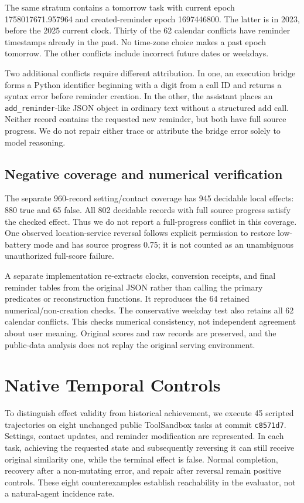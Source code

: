 \documentclass[10pt,letterpaper]{article}
\begin{document}
The same stratum contains a tomorrow task with current epoch 1758017671.957964 and created-reminder epoch 1697446800. The latter is in 2023, before the 2025 current clock. Thirty of the 62 calendar conflicts have reminder timestamps already in the past. No time-zone choice makes a past epoch tomorrow. The other conflicts include incorrect future dates or weekdays.

Two additional conflicts require different attribution. In one, an execution bridge forms a Python identifier beginning with a digit from a call ID and returns a syntax error before reminder creation. In the other, the assistant places an \texttt{add\_reminder}-like JSON object in ordinary text without a structured add call. Neither record contains the requested new reminder, but both have full source progress. We do not repair either trace or attribute the bridge error solely to model reasoning.

\subsection{Negative coverage and numerical verification}
The separate 960-record setting/contact coverage has 945 decidable local effects: 880 true and 65 false. All 802 decidable records with full source progress satisfy the checked effect. Thus we do not report a full-progress conflict in this coverage. One observed location-service reversal follows explicit permission to restore low-battery mode and has source progress 0.75; it is not counted as an unambiguous unauthorized full-score failure.

A separate implementation re-extracts clocks, conversion receipts, and final reminder tables from the original JSON rather than calling the primary predicates or reconstruction functions. It reproduces the 64 retained numerical/non-creation checks. The conservative weekday test also retains all 62 calendar conflicts. This checks numerical consistency, not independent agreement about user meaning. Original scores and raw records are preserved, and the public-data analysis does not replay the original serving environment.

\section{Native Temporal Controls}
\label{sec:controls}
To distinguish effect validity from historical achievement, we execute 45 scripted trajectories on eight unchanged public ToolSandbox tasks at commit \texttt{c8571d7}. Settings, contact updates, and reminder modification are represented. In each task, achieving the requested state and subsequently reversing it can still receive original similarity one, while the terminal effect is false. Normal completion, recovery after a non-mutating error, and repair after reversal remain positive controls. These eight counterexamples establish reachability in the evaluator, not a natural-agent incidence rate.
\end{document}
